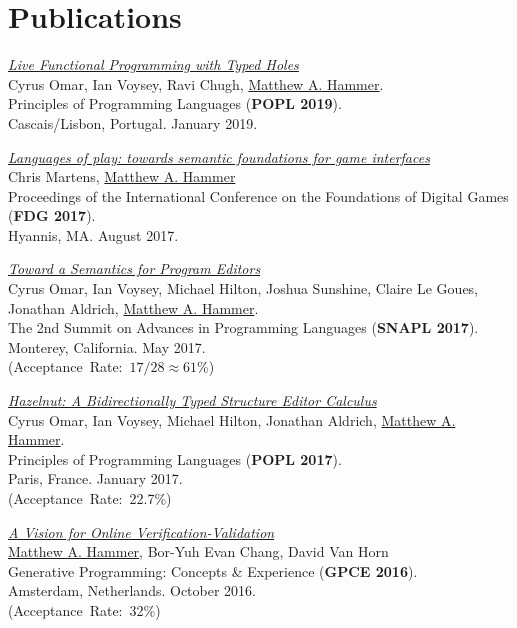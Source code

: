 \documentclass[10pt,letterpaper]{article}
\newcommand{\BeanCounter}[1]{(Acceptance~Rate:~#1\%)}
\renewenvironment{itemize}{
  \begin{list}{}{
    \setlength{\leftmargin}{1.5em}
    \setlength{\itemsep}{0.25em}
    \setlength{\parskip}{0pt}
    \setlength{\parsep}{0.25em}
  }
}{
  \end{list}
}
\begin{document}
\section*{Publications}
\begin{itemize}

\item
\href{https://arxiv.org/abs/1805.00155}{\textit{Live Functional Programming with Typed Holes}}
\\
Cyrus Omar, Ian Voysey, Ravi Chugh, \underline{Matthew A. Hammer}.
\\
Principles of Programming Languages (\textbf{POPL 2019}).
\\
Cascais/Lisbon, Portugal. January 2019.
  
\item
\href{https://arxiv.org/abs/1703.05410}
{\textit{Languages of play: towards semantic foundations for game interfaces}}
\\
Chris Martens, \underline{Matthew A. Hammer}
\\
Proceedings of the International Conference on the Foundations of Digital Games (\textbf{FDG 2017}).
\\
Hyannis, MA. August 2017.

\item
\href{http://hazelgrove.org/docs/hazel-vision-tr.pdf}{\textit{Toward a Semantics for Program Editors}}
\\
Cyrus Omar, Ian Voysey, Michael Hilton, Joshua Sunshine, Claire Le Goues, Jonathan Aldrich, \underline{Matthew A. Hammer}.
\\
The 2nd Summit on Advances in Programming Languages (\textbf{SNAPL 2017}).
\\
Monterey, California. May 2017.
\\
\BeanCounter{$17/28 \approx 61$}

\item
\href{https://arxiv.org/abs/1607.04180}{\textit{Hazelnut: A Bidirectionally Typed Structure Editor Calculus}}
\\
Cyrus Omar, Ian Voysey, Michael Hilton, Jonathan Aldrich, \underline{Matthew A. Hammer}.
\\
Principles of Programming Languages (\textbf{POPL 2017}).
\\
Paris, France. January 2017.
\\
\BeanCounter{22.7}

\item
\href{https://arxiv.org/abs/1608.06012}{\textit{A Vision for Online Verification-Validation}}
\\
\underline{Matthew A. Hammer}, Bor-Yuh Evan Chang, David Van Horn
\\
Generative Programming: Concepts \& Experience (\textbf{GPCE 2016}).
\\
Amsterdam, Netherlands. October 2016.
\\
\BeanCounter{32}


\end{itemize}
\end{document}
